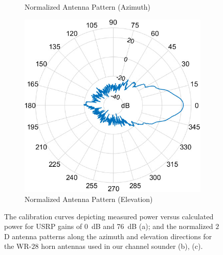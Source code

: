\documentclass[10pt, twocolumn]{IEEEtran}
\begin{document}
\begin{figure} [t]
\begin{subfigure}{0.309\linewidth}
         \caption{Normalized Antenna Pattern (Azimuth)}
         \label{F3b}
     \end{subfigure}
     \begin{subfigure}{0.309\linewidth}
         \centering
         \includegraphics[width=1.0\linewidth]{figs/antenna_elevation.jpg}
         \caption{Normalized Antenna Pattern (Elevation)}
         \label{F3c}
     \end{subfigure}
     \vspace{-2mm}
     \caption{The calibration curves depicting measured power versus calculated power for USRP gains of \SI{0}{\deci\bel} and \SI{76}{\deci\bel} (a); and the normalized $2$D antenna patterns along the azimuth and elevation directions for the WR-$28$ horn antennas used in our channel sounder (b), (c).}
     \label{F3}
     \vspace{-4mm}
\end{figure}
\end{document}
